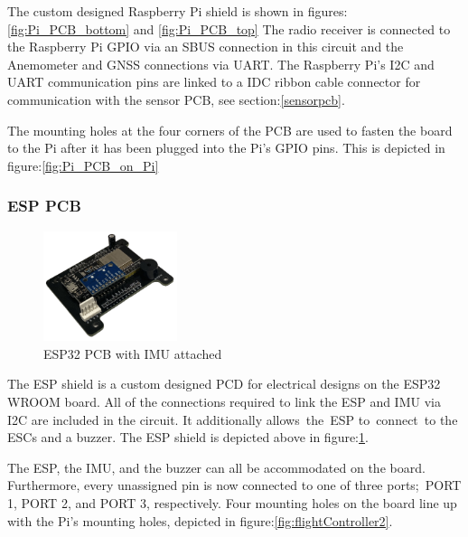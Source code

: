 \documentclass{article}
\begin{document}
The custom designed Raspberry Pi shield is shown in figures:\ref{fig:Pi_PCB_bottom} and \ref{fig:Pi_PCB_top} The radio receiver is connected to the Raspberry Pi GPIO via an SBUS connection in this circuit and the Anemometer and GNSS connections via UART. The Raspberry Pi's I2C and UART communication 
pins are linked to a IDC ribbon cable connector for communication with the sensor PCB, see section:\ref{sensorpcb}.

The mounting holes at the four corners of the PCB are used to fasten the board to the Pi after it has been plugged into the Pi's GPIO pins. This is depicted in figure:\ref{fig:Pi_PCB_on_Pi}

\subsubsection{ESP PCB}
\begin{figure}[H]
  \centering
  \includegraphics[width=0.35\textwidth]{Pictures/Esp_IMU_board.png}
  \caption{ESP32 PCB with IMU attached}
  \label{fig:Esp_IMU_PCB}
\end{figure}
The ESP shield is a custom designed PCD for electrical designs on the ESP32 WROOM board. All of the connections required to link the ESP and IMU via I2C are included in the circuit. It additionally allows the ESP to connect to the ESCs and a buzzer. The ESP shield is depicted above in figure:\ref{fig:Esp_IMU_PCB}.

The ESP, the IMU, and the buzzer can all be accommodated on the board. Furthermore, every unassigned pin is now connected to one of three ports; PORT 1, PORT 2, and PORT 3, respectively. Four mounting holes on the board line up with the Pi's mounting holes, depicted in figure:\ref{fig:flightController2}.
\end{document}
